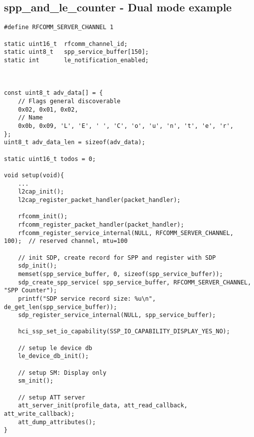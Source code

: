 
\subsection{spp\_and\_le\_counter - Dual mode example}


\begin{lstlisting}[caption= SPP\&LE client setup., label=code:spp_le_setup]
#define RFCOMM_SERVER_CHANNEL 1

static uint16_t  rfcomm_channel_id;
static uint8_t   spp_service_buffer[150];
static int       le_notification_enabled;



const uint8_t adv_data[] = {
    // Flags general discoverable
    0x02, 0x01, 0x02, 
    // Name
    0x0b, 0x09, 'L', 'E', ' ', 'C', 'o', 'u', 'n', 't', 'e', 'r', 
};
uint8_t adv_data_len = sizeof(adv_data);

static uint16_t todos = 0;

void setup(void){
	...
    l2cap_init();
    l2cap_register_packet_handler(packet_handler);

    rfcomm_init();
    rfcomm_register_packet_handler(packet_handler);
    rfcomm_register_service_internal(NULL, RFCOMM_SERVER_CHANNEL, 100);  // reserved channel, mtu=100

    // init SDP, create record for SPP and register with SDP
    sdp_init();
    memset(spp_service_buffer, 0, sizeof(spp_service_buffer));
    sdp_create_spp_service( spp_service_buffer, RFCOMM_SERVER_CHANNEL, "SPP Counter");
    printf("SDP service record size: %u\n", de_get_len(spp_service_buffer));
    sdp_register_service_internal(NULL, spp_service_buffer);

    hci_ssp_set_io_capability(SSP_IO_CAPABILITY_DISPLAY_YES_NO);

    // setup le device db
    le_device_db_init();

    // setup SM: Display only
    sm_init();

    // setup ATT server
    att_server_init(profile_data, att_read_callback, att_write_callback);    
    att_dump_attributes();
}
\end{lstlisting}

